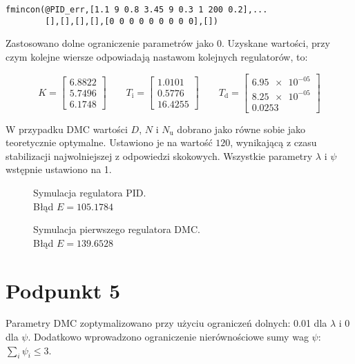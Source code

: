 \begin{lstlisting}[style=Matlab-editor]
fmincon(@PID_err,[1.1 9 0.8 3.45 9 0.3 1 200 0.2],...
        [],[],[],[],[0 0 0 0 0 0 0 0 0],[])
\end{lstlisting}

Zastosowano dolne ograniczenie parametrów jako 0. Uzyskane wartości, przy czym kolejne wiersze odpowiadają nastawom kolejnych regulatorów, to:

\begin{equation}
K = 
\begin{bmatrix}
\num{6,8822} \\ \num{5,7496} \\ \num{6,1748}
\end{bmatrix} \qquad
T_\mathrm{i} = 
\begin{bmatrix}
\num{1,0101} \\ \num{0,5776} \\ \num{16,4255}
\end{bmatrix} \qquad
T_\mathrm{d} =
\begin{bmatrix}
\num{6,95e-05} \\ \num{8,25e-05} \\ \num{0,0253}
\end{bmatrix}
\end{equation}

\bigskip

W przypadku DMC wartości $ D $, $ N $ i $ N_\mathrm{u} $ dobrano jako równe sobie jako teoretycznie optymalne. Ustawiono je na wartość $ 120 $, wynikającą z czasu stabilizacji najwolniejszej z odpowiedzi skokowych.
Wszystkie parametry $ \lambda $ i $ \psi $ wstępnie ustawiono na 1.

\begin{figure}[ht]
	\centering
	
	\caption{Symulacja regulatora PID.\\Błąd $ E = \num{105,1784} $}
	\label{Z4a}
\end{figure}

\begin{figure}[ht]
	\centering
	
	\caption{Symulacja pierwszego regulatora DMC.\\Błąd $ E = \num{139,6528}$}
	\label{Z4b}
\end{figure}

\chapter{Podpunkt 5}
Parametry DMC zoptymalizowano przy użyciu ograniczeń dolnych: \num{0,01} dla $ \lambda $ i 0 dla $ \psi $. Dodatkowo wprowadzono ograniczenie nierównościowe sumy wag $ \psi $: $ \sum_{i} \psi_i \le 3  $.

